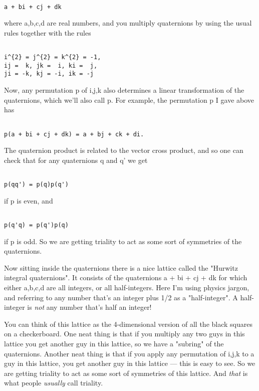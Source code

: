 \begin{verbatim}

a + bi + cj + dk
\end{verbatim}
    
where a,b,c,d are real numbers, and you multiply quaternions
by using the usual rules together with the rules


\begin{verbatim}

i^{2} = j^{2} = k^{2} = -1, 
ij =  k, jk =  i, ki =  j,
ji = -k, kj = -i, ik = -j
\end{verbatim}
    
Now, any permutation p of {i,j,k} also determines a linear 
transformation of the quaternions, which we'll also call p.  
For example, the permutation p I gave above has


\begin{verbatim}

p(a + bi + cj + dk) = a + bj + ck + di.
\end{verbatim}
    
The quaternion product is related to the vector cross product,
and so one can check that for any quaternions q and q' we
get 


\begin{verbatim}

p(qq') = p(q)p(q')
\end{verbatim}
    
if p is even, and


\begin{verbatim}

p(q'q) = p(q')p(q)
\end{verbatim}
    
if p is odd.  So we are getting triality to act as some sort
of symmetries of the quaternions.  

Now sitting inside the quaternions there is a nice lattice 
called the "Hurwitz integral quaternions".  It consists of 
the quaternions a + bi + cj + dk for which either a,b,c,d are 
all integers, or all half-integers.  Here I'm using physics jargon, 
and referring to any number that's an integer plus 1/2 as a 
"half-integer".  A half-integer is \emph{not} 
any number that's half 
an integer!   

You can think of this lattice as the 4-dimensional
version of all the black squares on a checkerboard.  
One neat thing is that if you multiply any two guys in
this lattice you get another guy in this lattice, so we
have a "subring" of the quaternions.  Another neat thing is 
that if you apply any permutation of {i,j,k} to a guy in this 
lattice, you get another guy in this lattice --- this is easy
to see.   So we are getting triality to act as some sort
of symmetries of this lattice.  And \emph{that} is what people
\emph{usually} call triality.  

